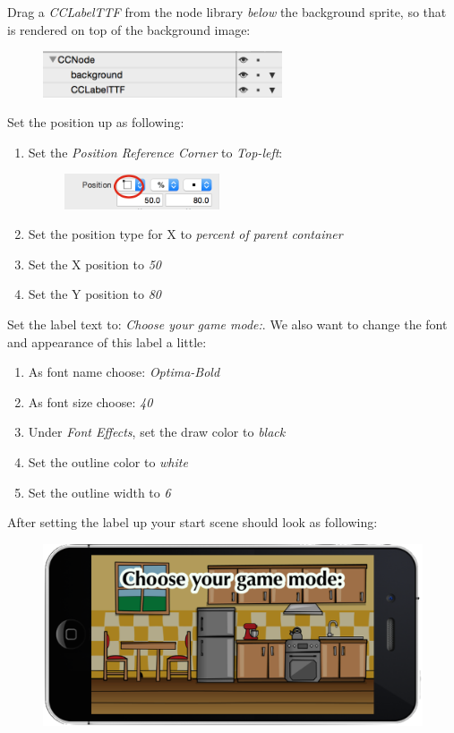 \begin{leftbar}
Drag a \textit{CCLabelTTF} from the node library \textit{below} the background
sprite, so that is rendered on top of the background image:
\begin{figure}[H]
    \centering
    \includegraphics[width=200pt]{images/Chapter7/label_ontop_background.png}
\end{figure}
 
Set the position up as following:
\begin{enumerate}
  \item Set the \textit{Position Reference Corner} to \textit{Top-left}:
  \begin{figure}[H]
    \centering
    \includegraphics[width=130pt]{images/Chapter7/pos_ref_corner.png}
\end{figure}
  \item Set the position type for X to \textit{percent of parent container}
  \item Set the X position to \textit{50}
  \item Set the Y position to \textit{80}
\end{enumerate}

Set the label text to: \textit{Choose your game mode:}. We also want to change
the font and appearance of this label a little:
\begin{enumerate}
  \item As font name choose: \textit{Optima-Bold}
  \item As font size choose: \textit{40}
  \item Under \textit{Font Effects}, set the draw color to \textit{black}
  \item Set the outline color to \textit{white}
  \item Set the outline width to \textit{6}
\end{enumerate}
\end{leftbar}

After setting the label up your start scene should look as following:

\begin{figure}[H]
		\centering
		\includegraphics[width=0.7\linewidth]{images/Chapter7/start_scene.png}
\end{figure}

